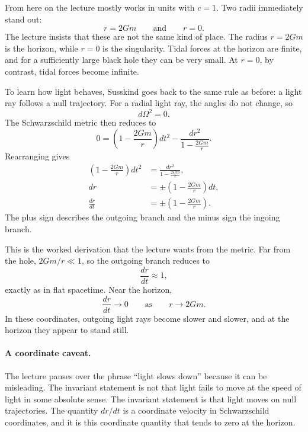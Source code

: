 From here on the lecture mostly works in units with \(c=1\). Two radii immediately stand out:
\begin{equation}
r=2Gm
\qquad\text{and}\qquad
r=0.
\end{equation}
The lecture insists that these are not the same kind of place. The radius \(r=2Gm\) is the horizon, while \(r=0\) is the singularity. Tidal forces at the horizon are finite, and for a sufficiently large black hole they can be very small. At \(r=0\), by contrast, tidal forces become infinite.

To learn how light behaves, Susskind goes back to the same rule as before: a light ray follows a null trajectory. For a radial light ray, the angles do not change, so
\begin{equation}
d\Omega^2=0.
\end{equation}
The Schwarzschild metric then reduces to
\begin{equation}
0=
\left(1-\frac{2Gm}{r}\right)dt^2
-
\frac{dr^2}{1-\frac{2Gm}{r}}.
\end{equation}
Rearranging gives
\begin{align}
\left(1-\frac{2Gm}{r}\right)dt^2 &= \frac{dr^2}{1-\frac{2Gm}{r}},\\
dr &= \pm\left(1-\frac{2Gm}{r}\right)dt,\\
\frac{dr}{dt} &= \pm\left(1-\frac{2Gm}{r}\right).
\end{align}
The plus sign describes the outgoing branch and the minus sign the ingoing branch.

This is the worked derivation that the lecture wants from the metric. Far from the hole, \(2Gm/r\ll 1\), so the outgoing branch reduces to
\begin{equation}
\frac{dr}{dt}\approx 1,
\end{equation}
exactly as in flat spacetime. Near the horizon,
\begin{equation}
\frac{dr}{dt}\to 0
\qquad\text{as}\qquad
r\to 2Gm.
\end{equation}
In these coordinates, outgoing light rays become slower and slower, and at the horizon they appear to stand still.

\paragraph{A coordinate caveat.}
The lecture pauses over the phrase ``light slows down'' because it can be misleading. The invariant statement is not that light fails to move at the speed of light in some absolute sense. The invariant statement is that light moves on null trajectories. The quantity \(dr/dt\) is a coordinate velocity in Schwarzschild coordinates, and it is this coordinate quantity that tends to zero at the horizon.

